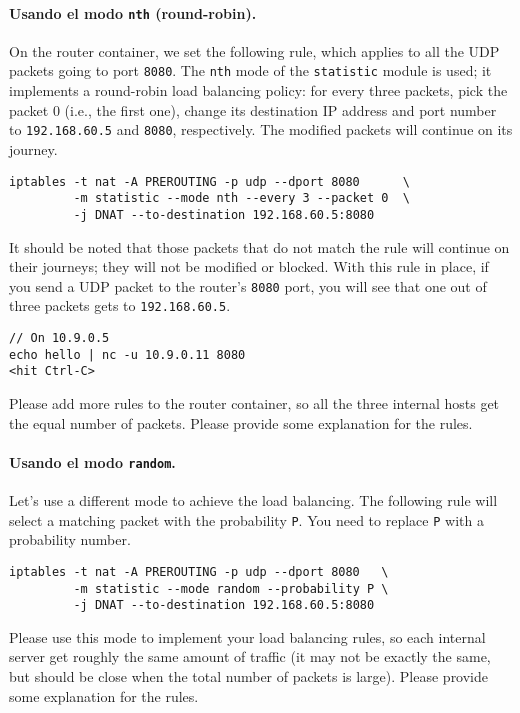 \paragraph{Usando el modo \texttt{nth} (round-robin).}
On the router container, we set the following rule, which applies 
to all the UDP packets going to port \texttt{8080}. 
The \texttt{nth} mode of the \texttt{statistic} module is used; 
it implements a round-robin load balancing policy: for every
three packets, pick the packet 0 (i.e., the first one), 
change its destination IP address and port number to 
\texttt{192.168.60.5}  and \texttt{8080}, respectively.  
The modified packets will continue on its journey.

\begin{lstlisting}
iptables -t nat -A PREROUTING -p udp --dport 8080      \
         -m statistic --mode nth --every 3 --packet 0  \
         -j DNAT --to-destination 192.168.60.5:8080
\end{lstlisting}

It should be noted that those packets that do not match
the rule will continue on their journeys; they will
not be modified or blocked. With this rule in place, 
if you send a UDP packet to the router's \texttt{8080} port,  
you will see that one out of three packets gets to 
\texttt{192.168.60.5}. 

\begin{lstlisting}
// On 10.9.0.5
echo hello | nc -u 10.9.0.11 8080
<hit Ctrl-C>
\end{lstlisting}
 

Please add more rules to the router container, 
so all the three internal hosts get the equal 
number of packets. 
Please provide some explanation for the rules. 


\paragraph{Usando el modo \texttt{random}.}
Let's use a different mode to achieve the load balancing. The following 
rule will select a matching packet with the probability \texttt{P}.  
You need to replace \texttt{P} with a probability number.

\begin{lstlisting}
iptables -t nat -A PREROUTING -p udp --dport 8080   \
         -m statistic --mode random --probability P \
         -j DNAT --to-destination 192.168.60.5:8080
\end{lstlisting}

Please use this mode to implement your load balancing 
rules, so each internal server get roughly the 
same amount of traffic (it may not be exactly the same, 
but should be close when the total number of packets is large). 
Please provide some explanation for the rules. 




